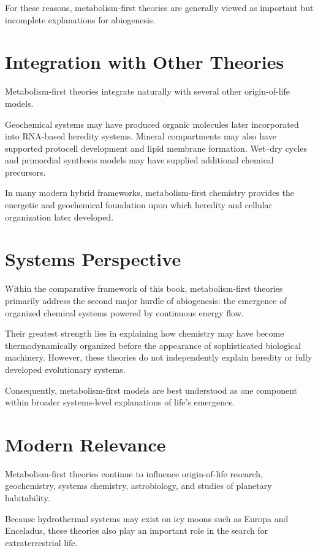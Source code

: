 \documentclass[
  oneside]{book}
\begin{document}
For these reasons, metabolism-first theories are generally viewed as important but incomplete explanations for abiogenesis.

\section{Integration with Other Theories}\label{integration-with-other-theories-2}

Metabolism-first theories integrate naturally with several other origin-of-life models.

Geochemical systems may have produced organic molecules later incorporated into RNA-based heredity systems. Mineral compartments may also have supported protocell development and lipid membrane formation. Wet--dry cycles and primordial synthesis models may have supplied additional chemical precursors.

In many modern hybrid frameworks, metabolism-first chemistry provides the energetic and geochemical foundation upon which heredity and cellular organization later developed.

\section{Systems Perspective}\label{systems-perspective-2}

Within the comparative framework of this book, metabolism-first theories primarily address the second major hurdle of abiogenesis: the emergence of organized chemical systems powered by continuous energy flow.

Their greatest strength lies in explaining how chemistry may have become thermodynamically organized before the appearance of sophisticated biological machinery. However, these theories do not independently explain heredity or fully developed evolutionary systems.

Consequently, metabolism-first models are best understood as one component within broader systems-level explanations of life's emergence.

\section{Modern Relevance}\label{modern-relevance-2}

Metabolism-first theories continue to influence origin-of-life research, geochemistry, systems chemistry, astrobiology, and studies of planetary habitability.

Because hydrothermal systems may exist on icy moons such as Europa and Enceladus, these theories also play an important role in the search for extraterrestrial life.
\end{document}
